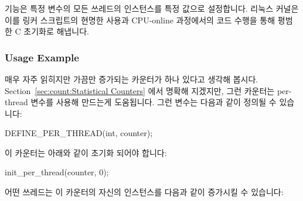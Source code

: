 \fi

\subsubsection{}

 기능은 특정 변수의 모든 쓰레드의 인스턴스를 특정
값으로 설정합니다.
리눅스 커널은 이를 링커 스크립트의 현명한 사용과 CPU-online 과정에서의 코드
수행을 통해 평범한 C 초기화로 해냅니다.

\subsubsection{Usage Example}

매우 자주 읽히지만 가끔만 증가되는 카운터가 하나 있다고 생각해 봅시다.
Section~\ref{sec:count:Statistical Counters} 에서 명확해 지겠지만, 그런
카운터는 per-thread 변수를 사용해 만드는게 도움됩니다.
그런 변수는 다음과 같이 정의될 수 있습니다:

\begin{VerbatimU}
DEFINE_PER_THREAD(int, counter);
\end{VerbatimU}

이 카운터는 아래와 같이 초기화 되어야 합니다:

\begin{VerbatimU}
init_per_thread(counter, 0);
\end{VerbatimU}

어떤 쓰레드는 이 카운터의 자신의 인스턴스를 다음과 같이 증가시킬 수 있습니다:

